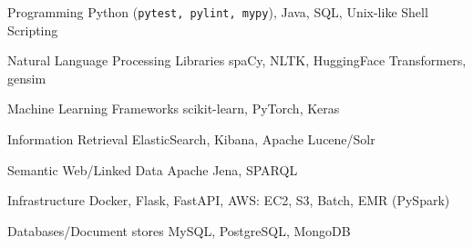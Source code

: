 

\begin{cvskills}

  \cvskill
    {Programming} %
    {Python (\texttt{pytest, pylint, mypy}), Java, SQL, Unix-like Shell Scripting} %

  \cvskill
    {Natural Language Processing Libraries} %
    {spaCy, NLTK, HuggingFace Transformers, gensim} %

  \cvskill
    {Machine Learning Frameworks} %
    {scikit-learn, PyTorch, Keras} %

  \cvskill
    {Information Retrieval} %
    {ElasticSearch, Kibana, Apache Lucene/Solr} %

  \cvskill
    {Semantic Web/Linked Data} %
    {Apache Jena, SPARQL} %

  \cvskill
    {Infrastructure} %
    {Docker, Flask, FastAPI, AWS: EC2, S3, Batch, EMR (PySpark)} %

  \cvskill
    {Databases/Document stores} %
    {MySQL, PostgreSQL, MongoDB} %

\end{cvskills}
